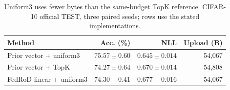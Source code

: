 \begin{table}[!ht]
\centering\small
\caption{Uniform3 uses fewer bytes than the same-budget TopK reference. CIFAR-10 official TEST, three paired seeds; rows use the stated implementations.}
\label{tab:reference}
\begin{tabular}{lrrr}
\toprule
Method & Acc. (\%) & NLL & Upload (B)\\
\midrule
Prior vector + uniform3 & $75.57\pm0.60$ & $0.645\pm0.014$ & 54,067\\
Prior vector + TopK & $74.27\pm0.64$ & $0.670\pm0.014$ & 54,808\\
FedRoD-linear + uniform3 & $74.30\pm0.41$ & $0.677\pm0.016$ & 54,067\\
\bottomrule
\end{tabular}
\end{table}
